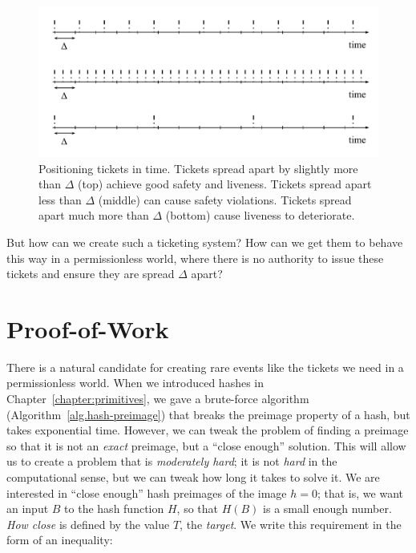 \begin{figure}[h]
    \centering
    \includegraphics[width=0.8 \columnwidth,keepaspectratio]{figures/time-tickets.pdf}
    \caption{Positioning tickets in time. Tickets spread apart by slightly more than $\Delta$ (top)
             achieve good safety and liveness. Tickets spread apart less than $\Delta$ (middle)
             can cause safety violations. Tickets spread apart much more than $\Delta$ (bottom)
             cause liveness to deteriorate.}
    \label{fig.time-tickets}
\end{figure}

But how can we create such a ticketing system? How can we get them to behave this way in a permissionless
world, where there is no authority to issue these tickets and ensure they are spread $\Delta$
apart?

\section{Proof-of-Work}

There is a natural candidate for creating rare events like the tickets we need in a permissionless
world. When we introduced hashes in Chapter~\ref{chapter:primitives}, we gave a brute-force algorithm
(Algorithm~\ref{alg.hash-preimage})
that breaks the preimage property of a hash, but takes exponential time. However, we can tweak
the problem of finding a preimage so that it is not an \emph{exact} preimage, but a ``close enough''
solution. This will allow us to create a problem that is \emph{moderately hard}; it is not \emph{hard}
in the computational sense, but we can tweak how long it takes to solve it. We are interested in
``close enough'' hash preimages of the image $h = 0$; that is, we want an input $B$ to the hash function
$H$, so that $H(B)$ is a small enough number. \emph{How close} is defined by the value $T$, the
\emph{target}.
We write this requirement in the form of an
inequality:

